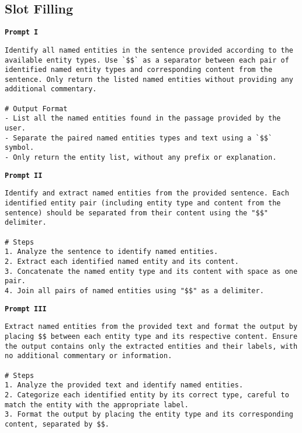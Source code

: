 \subsection{Slot Filling}
\texttt{\textbf{Prompt I}}
\begin{verbatim}
Identify all named entities in the sentence provided according to the available entity types. Use `$$` as a separator between each pair of identified named entity types and corresponding content from the sentence. Only return the listed named entities without providing any additional commentary.

# Output Format
- List all the named entities found in the passage provided by the user. 
- Separate the paired named entities types and text using a `$$` symbol.
- Only return the entity list, without any prefix or explanation.
\end{verbatim}
\texttt{\textbf{Prompt II}}
\begin{verbatim}
Identify and extract named entities from the provided sentence. Each identified entity pair (including entity type and content from the sentence) should be separated from their content using the "$$" delimiter.

# Steps
1. Analyze the sentence to identify named entities.
2. Extract each identified named entity and its content.
3. Concatenate the named entity type and its content with space as one pair.
4. Join all pairs of named entities using "$$" as a delimiter.
\end{verbatim}
\texttt{\textbf{Prompt III}}
\begin{verbatim}
Extract named entities from the provided text and format the output by placing $$ between each entity type and its respective content. Ensure the output contains only the extracted entities and their labels, with no additional commentary or information.

# Steps
1. Analyze the provided text and identify named entities.
2. Categorize each identified entity by its correct type, careful to match the entity with the appropriate label.
3. Format the output by placing the entity type and its corresponding content, separated by $$.
\end{verbatim}

